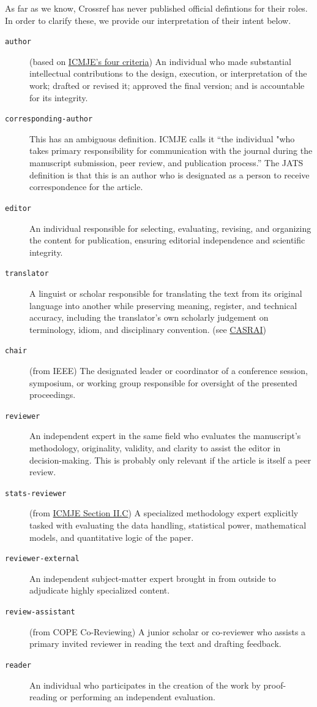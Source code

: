 \documentclass{article}
\begin{document}
As far as we know,
Crossref has never published official defintions for their roles. In order
to clarify these, we provide our interpretation of their intent below.
\begin{description}

\item[\texttt{author}] (based on \href{https://www.icmje.org/recommendations/browse/roles-and-responsibilities/defining-the-role-of-authors-and-contributors.html}{ICMJE's four criteria})
An individual who made substantial intellectual contributions to the design, execution, or interpretation of the work; drafted or revised it; approved the final version; and is accountable for its integrity.
\item[\texttt{corresponding-author}] This has an ambiguous definition. ICMJE calls it
``the individual "who takes primary responsibility for communication with the journal
during the manuscript submission, peer review, and publication process.'' The JATS definition
is that this is an author who is designated as a person to receive correspondence for
the article.
\item[\texttt{editor}] An individual responsible for selecting, evaluating, revising, and organizing the content for publication, ensuring editorial independence and scientific integrity.
\item[\texttt{translator}] A linguist or scholar responsible for translating the text from its original language into another
while preserving meaning, register, and technical accuracy, including the translator's own scholarly judgement on terminology, idiom, and disciplinary convention. (see \href{https://casrai.org/dictionary/term/translator-contribution}{CASRAI})
\item[\texttt{chair}] (from IEEE) The designated leader or coordinator of a conference session, symposium, or working group responsible for oversight of the presented proceedings.
\item[\texttt{reviewer}] An independent expert in the same field who evaluates the manuscript's methodology, originality,
validity, and clarity to assist the editor in decision-making. This is probably only relevant if the article is itself
a peer review.
\item[\texttt{stats-reviewer}] (from \href{https://www.icmje.org/recommendations/browse/roles-and-responsibilities/responsibilities-in-the-submission-and-peer-peview-process.html}{ICMJE Section II.C})
A specialized methodology expert explicitly tasked with evaluating the data handling, statistical power, mathematical models, and quantitative logic of the paper.
\item[\texttt{reviewer-external}] An independent subject-matter expert brought in from outside to adjudicate highly specialized content.
\item[\texttt{review-assistant}] (from COPE Co-Reviewing) A junior scholar or co-reviewer who assists a primary invited reviewer in reading the text and drafting feedback.
\item[\texttt{reader}] An individual who participates in the creation of the work by proof-reading or performing an independent evaluation.
\end{description}
\end{document}
